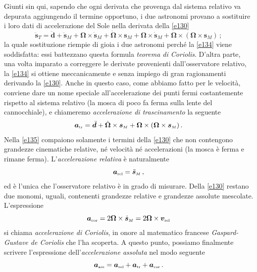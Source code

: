 \noindent Giunti sin qui, sapendo che ogni derivata che provenga dal sistema relativo va depurata
aggiungendo il termine opportuno, i due astronomi provano a sostituire i loro
dati di accelerazione del Sole nella derivata della \ref{e130}
\begin{equation}
\ddot{\bm{s}}_{\scriptscriptstyle{T}}=
	\ddot{\bm{d}}+
\ddot{\bm{s}}_{\scriptscriptstyle{M}}+
 {\bm \Omega}\times 
\dot{\bm{s}}_{\scriptscriptstyle{M}}+
\dot{\bm \Omega}\times 
	\bm{s}_{\scriptscriptstyle{M}}+
 {\bm \Omega}\times 
\dot{\bm{s}}_{\scriptscriptstyle{M}}+
 {\bm \Omega}\times( 
 {\bm \Omega}\times 
	\bm{s}_{\scriptscriptstyle{M}})\,;
\label{e134}
\end{equation}
\noindent la quale sostituzione riempie di gioia i due astronomi perch\'e la
\ref{e134} viene soddisfatta: essi battezzano questa formula 
{\em teorema di Coriolis}. D'altra parte, una volta imparato a correggere le 
derivate provenienti dall'osservatore relativo, la \ref{e134} si ottiene
meccanicamente e senza impiego di gran ragionamenti derivando la \ref{e130}.
Anche in questo caso, come abbiamo fatto per le velocit\`a,
 conviene dare un nome speciale all'accelerazione 
dei punti fermi costantemente rispetto al sistema relativo (la mosca di 
poco fa ferma sulla lente del cannocchiale), e chiameremo 
{\em accelerazione di trascinamento} la seguente
\begin{equation}
{\bm a}_{\scriptscriptstyle{{\rm tr}}}=
	\ddot{\bm{d}}+
\dot{\bm \Omega}\times 
	\bm{s}_{\scriptscriptstyle{M}}+
 {\bm \Omega}\times( 
 {\bm \Omega}\times 
        \bm{s}_{\scriptscriptstyle{M}})\,.
\label{e135}
\end{equation}
\noindent Nella \ref{e135} compaiono solamente i termini della \ref{e130} che non contengono
grandezze cinematiche relative, n\'e velocit\`a n\'e accelerazioni (la mosca \`e ferma e rimane ferma).
L'{\em accelerazione relativa} \`e naturalmente
\begin{equation}
{\bm a}_{\scriptscriptstyle{{\rm rel}}}=
\ddot{\bm{s}}_{\scriptscriptstyle{M}}\,,
\label{e136}
\end{equation}
\noindent ed \`e l'unica che l'osservatore relativo \`e in grado di misurare.
Della \ref{e130} restano due monomi, uguali, contenenti grandezze relative e grandezze
assolute  mescolate. L'espressione
\begin{equation}
{\bm a}_{\scriptscriptstyle{{\rm cor}}}=
2 {\bm \Omega}\times 
\dot{\bm{s}}_{\scriptscriptstyle{M}}=
2 {\bm \Omega}\times 
{\bm v}_{\scriptscriptstyle{{\rm rel}}}
\label{e137}
\end{equation}
\noindent si chiama {\em accelerazione di Coriolis}, in onore al matematico francese
{\em Gaspard-Gustave de Coriolis} che l'ha scoperta.
A questo punto, possiamo finalmente scrivere l'espressione
dell'{\em accelerazione assoluta}
nel modo seguente
\begin{equation}
{\bm a}_{\scriptscriptstyle{{\rm ass}}}=
{\bm a}_{\scriptscriptstyle{{\rm rel}}}+
{\bm a}_{\scriptscriptstyle{{\rm tr}}}+
{\bm a}_{\scriptscriptstyle{{\rm cor}}}\,.
\label{e138}
\end{equation}

